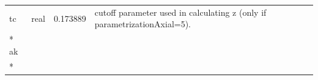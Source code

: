 \documentclass{article}
\begin{document}
\begin{longtable}{llll}
\midrule
tc & \begin{minipage}[t]{2cm}real\end{minipage} & \begin{minipage}[t]{2cm}0.173889\end{minipage} & \begin{minipage}[t]{12cm}cutoff parameter used in calculating z (only if parametrizationAxial=5).\end{minipage}\\*
\midrule
ak & \begin{minipage}[t]{2cm}\end{minipage} & \begin{minipage}[t]{2cm}\end{minipage} & \begin{minipage}[t]{12cm}\end{minipage}\\*
\bottomrule
\end{longtable}
{ }



\end{document}

